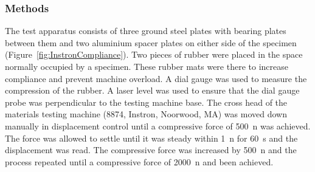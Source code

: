 \subsubsection{Methods}
The test apparatus consists of three ground steel plates with bearing plates between them and two aluminium spacer plates on either side of the specimen (Figure~\ref{fig:InstronCompliance}).
Two pieces of rubber were placed in the space normally occupied by a specimen.
These rubber mats were there to increase compliance and prevent machine overload.
A dial gauge was used to measure the compression of the rubber.
A laser level was used to ensure that the dial gauge probe was perpendicular to the testing machine base.
The cross head of the materials testing machine (8874, Instron, Noorwood, MA) was moved down manually in displacement control until a compressive force of 500~\ac{n} was achieved.
The force was allowed to settle until it was steady within 1~\ac{n} for 60~\ac{s} and the displacement was read.
The compressive force was increased by 500~\ac{n} and the process repeated until a compressive force of 2000~\ac{n} and been achieved.

